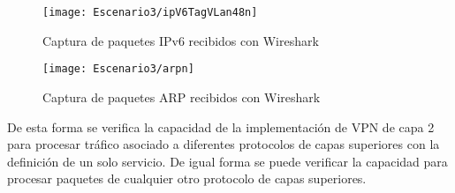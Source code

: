 \begin{figure}[h!] 
\centering    
\texttt{[image: Escenario3/ipV6TagVLan48n]}
\caption[Captura de paquetes IPv6 recibidos con Wireshark]{Captura de paquetes IPv6 recibidos con Wireshark}
\label{fig:CapturaTCP}
\end{figure}

\begin{figure}[h!] 
\centering    
\texttt{[image: Escenario3/arpn]}
\caption[Captura de paquetes ARP recibidos con Wireshark]{Captura de paquetes ARP recibidos con Wireshark}
\label{fig:CapturaTCP}
\end{figure}


De esta forma se verifica la capacidad de la implementaci\'on de VPN de capa 2 para procesar tr\'afico asociado a diferentes protocolos de capas superiores con la definici\'on de un solo servicio. De igual forma se puede verificar la capacidad para procesar paquetes de cualquier otro protocolo de capas superiores.\\ 